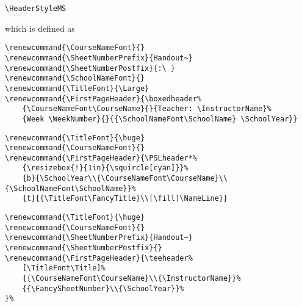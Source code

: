 \documentclass[12pt,twoside,parskip,notitle,showframe]{handout}
\begin{document}
\newpage

\begingroup
\HeaderStyleMS
\maketitle
\verb|\HeaderStyleMS|

which is defined as

\singlespacing
\begin{verbatim}
\renewcommand{\CourseNameFont}{}
\renewcommand{\SheetNumberPrefix}{Handout~}
\renewcommand{\SheetNumberPostfix}{:\ }
\renewcommand{\SchoolNameFont}{}
\renewcommand{\TitleFont}{\Large}
\renewcommand{\FirstPageHeader}{\boxedheader%
    {\CourseNameFont\CourseName}{}{Teacher: \InstructorName}%
    {Week \WeekNumber}{}{{\SchoolNameFont\SchoolName} \SchoolYear}}
\end{verbatim}
\endgroup

\newpage

\begingroup
\renewcommand{\Title}{A very very very long title indeed!}
\renewcommand{\TitleFont}{\huge}
\renewcommand{\CourseNameFont}{}
\renewcommand{\FirstPageHeader}{\PSLheader*%
	{\resizebox{!}{1in}{\squircle[cyan]}}%
	{b}{\SchoolYear\\{\CourseNameFont\CourseName}\\{\SchoolNameFont\SchoolName}}%
	{t}{{\TitleFont\FancyTitle}\\[\fill]\NameLine}}
\maketitle
\singlespacing
\begin{verbatim}
\renewcommand{\TitleFont}{\huge}
\renewcommand{\CourseNameFont}{}
\renewcommand{\FirstPageHeader}{\PSLheader*%
    {\resizebox{!}{1in}{\squircle[cyan]}}%
    {b}{\SchoolYear\\{\CourseNameFont\CourseName}\\{\SchoolNameFont\SchoolName}}%
    {t}{{\TitleFont\FancyTitle}\\[\fill]\NameLine}}
\end{verbatim}
\endgroup

\newpage

\begingroup
\renewcommand{\TitleFont}{\huge}
\renewcommand{\CourseNameFont}{}
\renewcommand{\SheetNumberPrefix}{Handout~}
\renewcommand{\SheetNumberPostfix}{}
\renewcommand{\FirstPageHeader}{\teeheader%
	[\TitleFont\Title]%
	{{\CourseNameFont\CourseName}\\{\InstructorName}}%
	{{\FancySheetNumber}\\{\SchoolYear}}%
}%
\maketitle
\singlespacing
\begin{verbatim}
\renewcommand{\TitleFont}{\huge}
\renewcommand{\CourseNameFont}{}
\renewcommand{\SheetNumberPrefix}{Handout~}
\renewcommand{\SheetNumberPostfix}{}
\renewcommand{\FirstPageHeader}{\teeheader%
    [\TitleFont\Title]%
    {{\CourseNameFont\CourseName}\\{\InstructorName}}%
    {{\FancySheetNumber}\\{\SchoolYear}}%
}%
\end{verbatim}
\endgroup
\end{document}
